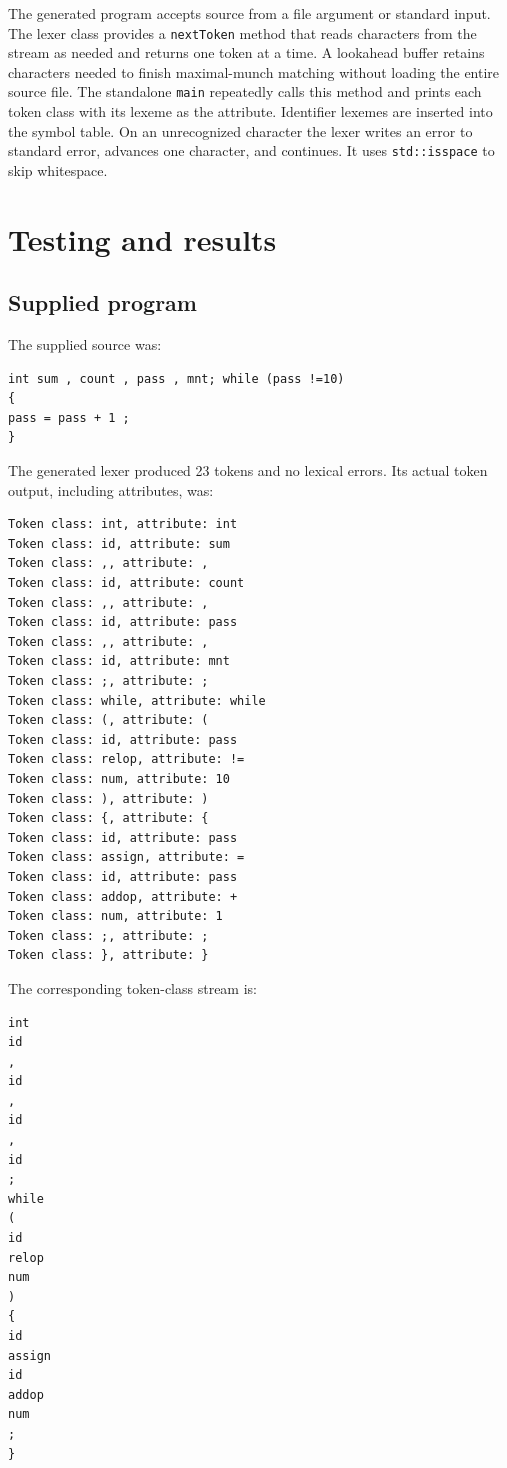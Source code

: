 \documentclass[11pt,a4paper]{article}
\newcommand{\code}[1]{\texttt{#1}}
\begin{document}
The generated program accepts source from a file argument or standard
input. The lexer class provides a \code{nextToken} method that reads
characters from the stream as needed and returns one token at a time. A lookahead buffer
retains characters needed to finish maximal-munch matching without
loading the entire source file. The standalone \code{main} repeatedly
calls this method and prints each token class with its lexeme as the
attribute. Identifier lexemes are inserted into the symbol table. On an
unrecognized character the lexer writes an error to standard error,
advances one character, and continues. It uses \code{std::isspace} to
skip whitespace.

\section{Testing and results}

\subsection{Supplied program}

The supplied source was:

\begin{lstlisting}
int sum , count , pass , mnt; while (pass !=10)
{
pass = pass + 1 ;
}
\end{lstlisting}

The generated lexer produced 23 tokens and no lexical errors. Its actual
token output, including attributes, was:

\begin{lstlisting}
Token class: int, attribute: int
Token class: id, attribute: sum
Token class: ,, attribute: ,
Token class: id, attribute: count
Token class: ,, attribute: ,
Token class: id, attribute: pass
Token class: ,, attribute: ,
Token class: id, attribute: mnt
Token class: ;, attribute: ;
Token class: while, attribute: while
Token class: (, attribute: (
Token class: id, attribute: pass
Token class: relop, attribute: !=
Token class: num, attribute: 10
Token class: ), attribute: )
Token class: {, attribute: {
Token class: id, attribute: pass
Token class: assign, attribute: =
Token class: id, attribute: pass
Token class: addop, attribute: +
Token class: num, attribute: 1
Token class: ;, attribute: ;
Token class: }, attribute: }
\end{lstlisting}

The corresponding token-class stream is:

\begin{lstlisting}
int
id
,
id
,
id
,
id
;
while
(
id
relop
num
)
{
id
assign
id
addop
num
;
}
\end{lstlisting}
\end{document}
